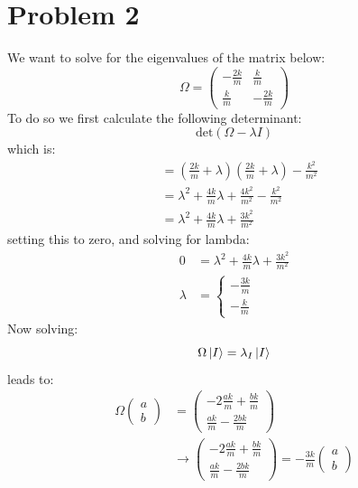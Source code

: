 \documentclass[10pt,twocoloumn]{article}
\begin{document}
\section*{Problem 2}
We want to solve for the eigenvalues of the matrix below:
\begin{equation}
    \Omega = \begin{pmatrix} -\frac{2k}{m} &\frac km \\ \frac km & -\frac{2k}{m} \end{pmatrix}
\end{equation}
To do so we first calculate the following determinant:
\begin{equation}
    \text{det}\left(\Omega - \lambda I \right)
\end{equation}
which is:
\begin{align}
    &= (\frac{2k}{m} +\lambda)(\frac{2k}{m} + \lambda) - \frac{k^2}{m^2}\\
    &= \lambda^2 + \frac{4k}{m}\lambda + \frac{4k^2}{m^2} - \frac{k^2}{m^2}\\
    &= \lambda^2 + \frac{4k}{m}{\lambda} + \frac{3k^2}{m^2}
\end{align}
setting this to zero, and solving for lambda:
\begin{align}
 0  &= \lambda^2 + \frac{4k}{m}{\lambda} + \frac{3k^2}{m^2} \\
    \lambda &= \begin{cases}
            -\frac{3k}{m} \\
            -\frac{k}{m}
    \end{cases}
\end{align}
Now solving:
\begin{equation}
    \Omega \left| I \right\rangle = \lambda_I \left| I \right\rangle
\end{equation}
leads to:
\begin{align}
    \Omega \begin{pmatrix} a \\ b \end{pmatrix} &= \begin{pmatrix} -2\frac{ak}{m} + \frac{bk}{m} \\ \frac{ak}{m} -\frac{2bk}{m}\end{pmatrix}\\
    &\rightarrow \begin{pmatrix} -2\frac{ak}{m} + \frac{bk}{m} \\ \frac{ak}{m} -\frac{2bk}{m}\end{pmatrix} = -\frac{3k}{m} \begin{pmatrix} a \\ b \end{pmatrix}
\end{align}
\end{document}
